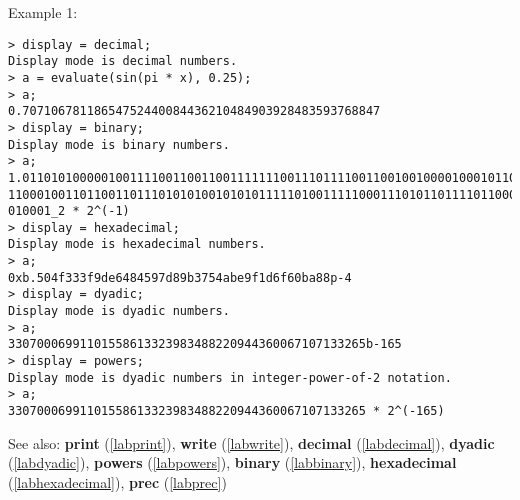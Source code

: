 \noindent Example 1: 
\begin{center}\begin{minipage}{15cm}\begin{Verbatim}[frame=single]
> display = decimal;
Display mode is decimal numbers.
> a = evaluate(sin(pi * x), 0.25);
> a;
0.70710678118654752440084436210484903928483593768847
> display = binary;
Display mode is binary numbers.
> a;
1.011010100000100111100110011001111111001110111100110010010000100010110010111110
11000100110110011011101010100101010111110100111110001110101101111011000001011101
010001_2 * 2^(-1)
> display = hexadecimal;
Display mode is hexadecimal numbers.
> a;
0xb.504f333f9de6484597d89b3754abe9f1d6f60ba88p-4
> display = dyadic;
Display mode is dyadic numbers.
> a;
33070006991101558613323983488220944360067107133265b-165
> display = powers;
Display mode is dyadic numbers in integer-power-of-2 notation.
> a;
33070006991101558613323983488220944360067107133265 * 2^(-165)
\end{Verbatim}
\end{minipage}\end{center}
See also: \textbf{print} (\ref{labprint}), \textbf{write} (\ref{labwrite}), \textbf{decimal} (\ref{labdecimal}), \textbf{dyadic} (\ref{labdyadic}), \textbf{powers} (\ref{labpowers}), \textbf{binary} (\ref{labbinary}), \textbf{hexadecimal} (\ref{labhexadecimal}), \textbf{prec} (\ref{labprec})
